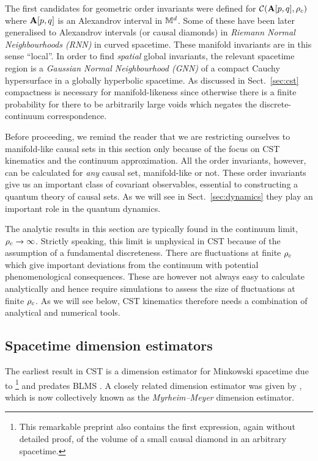 The first candidates for geometric order invariants were defined for $\mathcal C(\mathbf A[p,q],\rho_c)$ where  $\mathbf A[p,q]$
is an  Alexandrov interval in $\mathbb M^d$. Some of these have 
been later generalised to Alexandrov intervals (or causal diamonds)  in \emph{Riemann Normal Neighbourhoods (RNN)} in
curved spacetime. These manifold invariants are in this sense ``local''. 
In order to find \emph{spatial}  global invariants, the relevant spacetime region is  
a \emph{Gaussian Normal Neighbourhood (GNN)} of a compact Cauchy hypersurface in a globally hyperbolic spacetime. As
discussed in Sect.~\ref{sec:cst}  compactness is
necessary for manifold-likeness since otherwise  there is a finite probability for there to be  arbitrarily large voids which negates the
discrete-continuum correspondence.   


Before proceeding, we remind the reader that we are restricting ourselves to  manifold-like causal sets in this section
only because of the focus on  CST kinematics and the continuum approximation. All the order invariants, however, can be calculated
for \emph{any}  causal set, manifold-like  or not. These order invariants give us an important class of covariant
observables,  essential to constructing a 
quantum theory of causal sets. As we will see in Sect.~\ref{sec:dynamics} they play an important role in the
quantum dynamics. 

The analytic results in this section are typically found in the continuum limit,  $\rho_c \rightarrow \infty$.  Strictly
speaking, this limit is unphysical in CST because of the assumption of a fundamental discreteness. There are 
fluctuations at  finite $\rho_c $ which give important deviations from the continuum with potential phenomenological consequences. These are 
however  not always easy to calculate analytically and hence require simulations 
to assess  the size of fluctuations at finite $\rho_c$. As we will see below, CST kinematics therefore needs a combination
of analytical and numerical tools. 


\subsection{Spacetime dimension estimators} 
\label{ssec:dimn} 

The earliest result in CST is a dimension estimator for Minkowski spacetime due to \cite{myrheim}\footnote{This remarkable preprint also
  contains the first expression, again without  detailed proof, of the volume of a small causal diamond in an arbitrary
  spacetime.} and predates BLMS \citep{blms}.  A closely related dimension estimator 
was given by \cite{meyer}, which is now collectively known as the \emph{Myrheim--Meyer}
dimension estimator.  

